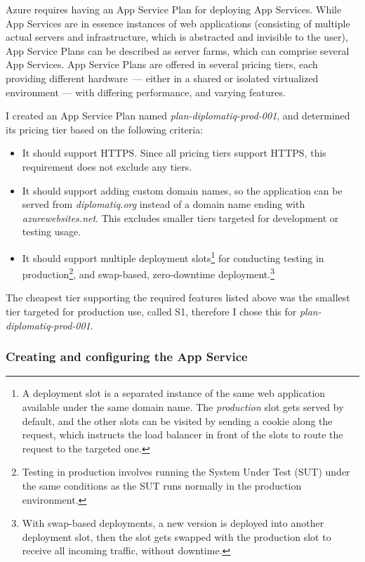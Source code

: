 Azure requires having an App Service Plan for deploying App Services. While App Services are in essence instances of web applications (consisting of multiple actual servers and infrastructure, which is abstracted and invisible to the user), App Service Plans can be described as server farms, which can comprise several App Services. App Service Plans are offered in several pricing tiers, each providing different hardware — either in a shared or isolated virtualized environment — with differing performance, and varying features.

I created an App Service Plan named \emph{plan-diplomatiq-prod-001}, and determined its pricing tier based on the following criteria:

\begin{itemize}
\item It should support HTTPS. Since all pricing tiers support HTTPS, this requirement does not exclude any tiers.
\item It should support adding custom domain names, so the application can be served from \emph{diplomatiq.org} instead of a domain name ending with \emph{azurewebsites.net}. This excludes smaller tiers targeted for development or testing usage.
\item It should support multiple deployment slots\footnote{A deployment slot is a separated instance of the same web application available under the same domain name. The \emph{production} slot gets served by default, and the other slots can be visited by sending a cookie along the request, which instructs the load balancer in front of the slots to route the request to the targeted one.} for conducting testing in production\footnote{Testing in production involves running the System Under Test (SUT) under the same conditions as the SUT runs normally in the production environment.}, and swap-based, zero-downtime deployment.\footnote{With swap-based deployments, a new version is deployed into another deployment slot, then the slot gets swapped with the production slot to receive all incoming traffic, without downtime.}
\end{itemize}

The cheapest tier supporting the required features listed above was the smallest tier targeted for production use, called S1, therefore I chose this for \emph{plan-diplomatiq-prod-001}.

\subsubsection{Creating and configuring the App Service}

